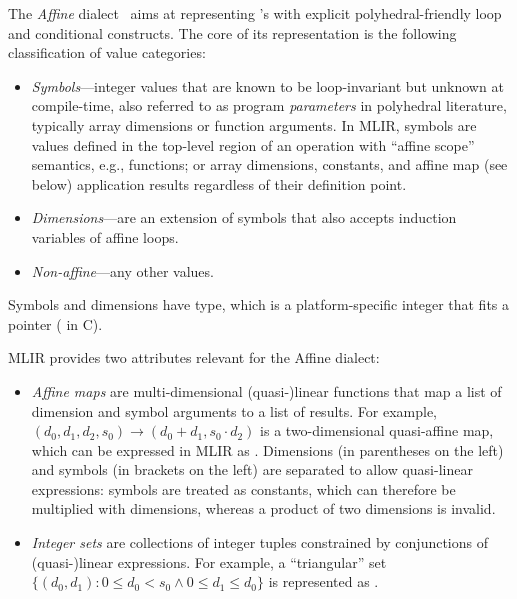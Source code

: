 The \emph{Affine} dialect~\cite{mlir_affine} aims at representing \scop's with explicit polyhedral-friendly loop and conditional constructs.
The core of its representation is the following classification of value categories:
\begin{itemize}
    \item \emph{Symbols}---integer values that are known to be loop-invariant but unknown at compile-time, also referred to as program \emph{parameters} in polyhedral literature, typically array dimensions or function arguments. In MLIR, symbols are values defined in the top-level region of an operation with ``affine scope'' semantics, e.g., functions; or array dimensions, constants, and affine map (see below) application results regardless of their definition point.
    \item \emph{Dimensions}---are an extension of symbols that also accepts induction variables of affine loops.
    \item \emph{Non-affine}---any other values.
\end{itemize}
Symbols and dimensions have  type, which is a platform-specific integer that fits a pointer ( in C).

MLIR provides two attributes relevant for the Affine dialect:
\begin{itemize}
\item
\emph{Affine maps} are multi-dimensional (quasi-)linear functions that map a list of dimension and symbol arguments to a list of results.
For example, $(d_0, d_1, d_2, s_0) \rightarrow (d_0 + d_1, s_0 \cdot d_2)$ is a two-dimensional quasi-affine map, which can be expressed
in MLIR as .
Dimensions (in parentheses on the left) and symbols (in brackets on the left) are separated to allow quasi-linear expressions: symbols are treated as constants, which can therefore be multiplied with dimensions, whereas a product of two dimensions is invalid.
\item
\emph{Integer sets} are collections of integer tuples constrained by conjunctions of (quasi-)linear expressions.
For example, a ``triangular'' set $\{(d_0, d_1) : 0 \leq d_0 < s_0 \land 0 \leq d_1 \leq d_0\}$ is represented as
.
\end{itemize}


